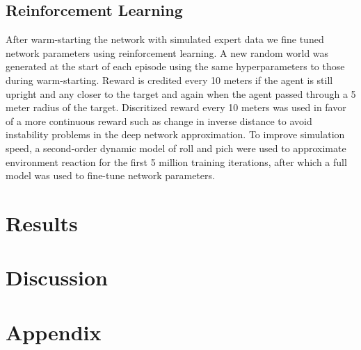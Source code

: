 \documentclass[paper=a4, fontsize=11pt]{scrartcl} %
\begin{document}
	\subsection{Reinforcement Learning} 
	After warm-starting the network with simulated expert data we fine tuned network parameters using reinforcement learning. A new random world was generated at the start of each episode using the same hyperparameters to those during warm-starting. Reward is credited every 10 meters if the agent is still upright and any closer to the target and again when the agent passed through a 5 meter radius of the target. Discritized reward every 10 meters was used in favor of a more continuous reward such as change in inverse distance to avoid instability problems in the deep network approximation. To improve simulation speed, a second-order dynamic model of roll and pich were used to approximate environment reaction for the first 5 million training iterations, after which a full model was used to fine-tune network parameters.


\section{Results}


\section{Discussion}


\section{Appendix}




\end{document}
